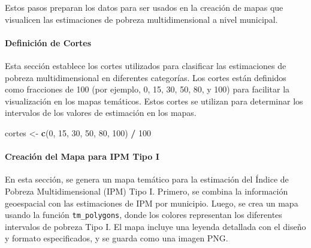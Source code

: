 \documentclass[
  12pt,
]{book}
\newenvironment{Shaded}{\begin{snugshade}}{\end{snugshade}}
\newcommand{\DecValTok}[1]{\textcolor[rgb]{0.00,0.00,0.81}{#1}}
\newcommand{\FunctionTok}[1]{\textcolor[rgb]{0.13,0.29,0.53}{\textbf{#1}}}
\newcommand{\NormalTok}[1]{#1}
\newcommand{\OtherTok}[1]{\textcolor[rgb]{0.56,0.35,0.01}{#1}}
\newcommand{\SpecialCharTok}[1]{\textcolor[rgb]{0.81,0.36,0.00}{\textbf{#1}}}
\begin{document}
Estos pasos preparan los datos para ser usados en la creación de mapas que visualicen las estimaciones de pobreza multidimensional a nivel municipal.

\hypertarget{definiciuxf3n-de-cortes}{%
\paragraph*{Definición de Cortes}\label{definiciuxf3n-de-cortes}}

Esta sección establece los cortes utilizados para clasificar las estimaciones de pobreza multidimensional en diferentes categorías. Los cortes están definidos como fracciones de 100 (por ejemplo, 0, 15, 30, 50, 80, y 100) para facilitar la visualización en los mapas temáticos. Estos cortes se utilizan para determinar los intervalos de los valores de estimación en los mapas.

\begin{Shaded}
\begin{Highlighting}[]
\NormalTok{cortes }\OtherTok{\textless{}{-}} \FunctionTok{c}\NormalTok{(}\DecValTok{0}\NormalTok{, }\DecValTok{15}\NormalTok{, }\DecValTok{30}\NormalTok{, }\DecValTok{50}\NormalTok{, }\DecValTok{80}\NormalTok{, }\DecValTok{100}\NormalTok{) }\SpecialCharTok{/} \DecValTok{100}
\end{Highlighting}
\end{Shaded}

\hypertarget{creaciuxf3n-del-mapa-para-ipm-tipo-i}{%
\paragraph*{Creación del Mapa para IPM Tipo I}\label{creaciuxf3n-del-mapa-para-ipm-tipo-i}}

En esta sección, se genera un mapa temático para la estimación del Índice de Pobreza Multidimensional (IPM) Tipo I. Primero, se combina la información geoespacial con las estimaciones de IPM por municipio. Luego, se crea un mapa usando la función \texttt{tm\_polygons}, donde los colores representan los diferentes intervalos de pobreza Tipo I. El mapa incluye una leyenda detallada con el diseño y formato especificados, y se guarda como una imagen PNG.
\end{document}
